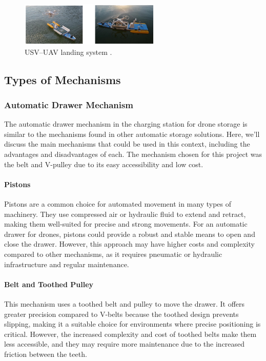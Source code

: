     \begin{figure}[h!]
        \centering
        \includegraphics[width=0.6\textwidth]{pictures/mobile_3.png}
        \caption{USV–UAV landing system \cite{grlj_docking_stations}.}
        \label{fig:mobile_charging}
    \end{figure}


\subsection{Types of Mechanisms}
    \subsubsection{Automatic Drawer Mechanism}
    The automatic drawer mechanism in the charging station for drone storage is similar to the mechanisms found in other automatic storage solutions. Here, we'll discuss the main mechanisms that could be used in this context, including the advantages and disadvantages of each. The mechanism chosen for this project was the belt and V-pulley due to its easy accessibility and low cost.
    
    \paragraph{Pistons} Pistons are a common choice for automated movement in many types of machinery. They use compressed air or hydraulic fluid to extend and retract, making them well-suited for precise and strong movements. For an automatic drawer for drones, pistons could provide a robust and stable means to open and close the drawer. However, this approach may have higher costs and complexity compared to other mechanisms, as it requires pneumatic or hydraulic infrastructure and regular maintenance.
    
    \paragraph{Belt and Toothed Pulley} This mechanism uses a toothed belt and pulley to move the drawer. It offers greater precision compared to V-belts because the toothed design prevents slipping, making it a suitable choice for environments where precise positioning is critical. However, the increased complexity and cost of toothed belts make them less accessible, and they may require more maintenance due to the increased friction between the teeth.
    
